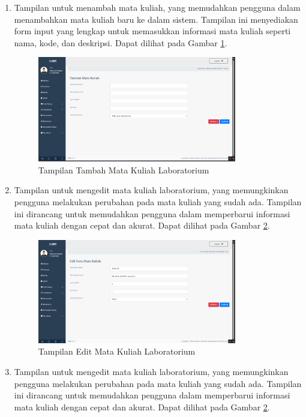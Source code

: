 \begin{enumerate}
	\item Tampilan untuk menambah mata kuliah, yang memudahkan pengguna dalam menambahkan mata kuliah baru ke dalam sistem. Tampilan ini menyediakan form input yang lengkap untuk memasukkan informasi mata kuliah seperti nama, kode, dan deskripsi. Dapat dilihat pada Gambar \ref{fig:tambah-matkul}.
	      \begin{figure}
		      \centering
		      \includegraphics[width=0.82\textwidth]{konten/gambar/hasil/tambah-matkul.png}
		      \caption{Tampilan Tambah Mata Kuliah Laboratorium}
		      \label{fig:tambah-matkul}
	      \end{figure}
	\item Tampilan untuk mengedit mata kuliah laboratorium, yang memungkinkan pengguna melakukan perubahan pada mata kuliah yang sudah ada. Tampilan ini dirancang untuk memudahkan pengguna dalam memperbarui informasi mata kuliah dengan cepat dan akurat. Dapat dilihat pada Gambar \ref{fig:edit-matkul}.
	      \begin{figure}
		      \centering
		      \includegraphics[width=0.82\textwidth]{konten/gambar/hasil/edit-matkul.png}
		      \caption{Tampilan Edit Mata Kuliah Laboratorium}
		      \label{fig:edit-matkul}
	      \end{figure}
	\item Tampilan untuk mengedit mata kuliah laboratorium, yang memungkinkan pengguna melakukan perubahan pada mata kuliah yang sudah ada. Tampilan ini dirancang untuk memudahkan pengguna dalam memperbarui informasi mata kuliah dengan cepat dan akurat. Dapat dilihat pada Gambar \ref{fig:edit-matkul}.

\end{enumerate}
